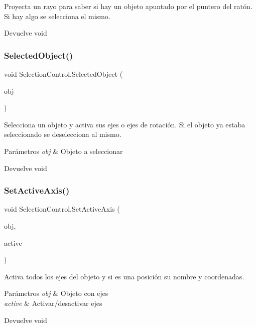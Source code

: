 Proyecta un rayo para saber si hay un objeto apuntado por el puntero del ratón. Si hay algo se selecciona el mismo. \begin{DoxyReturn}{Devuelve}
void 
\end{DoxyReturn}
\mbox{\label{class_selection_control_a3da021bd2d11255eadadc832b40e6fb6}} 
\subsubsection{\texorpdfstring{SelectedObject()}{SelectedObject()}}
{\footnotesize\ttfamily void Selection\+Control.\+Selected\+Object (\begin{DoxyParamCaption}\item[{Game\+Object}]{obj }\end{DoxyParamCaption})\hspace{0.3cm}{\ttfamily [inline]}}

Selecciona un objeto y activa sus ejes o ejes de rotación. Si el objeto ya estaba seleccionado se deselecciona al mismo. 
\begin{DoxyParams}{Parámetros}
{\em obj} & Objeto a seleccionar \\
\hline
\end{DoxyParams}
\begin{DoxyReturn}{Devuelve}
void 
\end{DoxyReturn}
\mbox{\label{class_selection_control_af45a0f8f9cf7f200e423971f190d8bbf}} 
\subsubsection{\texorpdfstring{SetActiveAxis()}{SetActiveAxis()}}
{\footnotesize\ttfamily void Selection\+Control.\+Set\+Active\+Axis (\begin{DoxyParamCaption}\item[{Transform}]{obj,  }\item[{bool}]{active }\end{DoxyParamCaption})\hspace{0.3cm}{\ttfamily [inline]}}

Activa todos los ejes del objeto y si es una posición su nombre y coordenadas. 
\begin{DoxyParams}{Parámetros}
{\em obj} & Objeto con ejes \\
\hline
{\em active} & Activar/desactivar ejes \\
\hline
\end{DoxyParams}
\begin{DoxyReturn}{Devuelve}
void 
\end{DoxyReturn}
\mbox{\label{class_selection_control_a124591d0f0eac9b99cd9a7cc4f9839c7}} 
